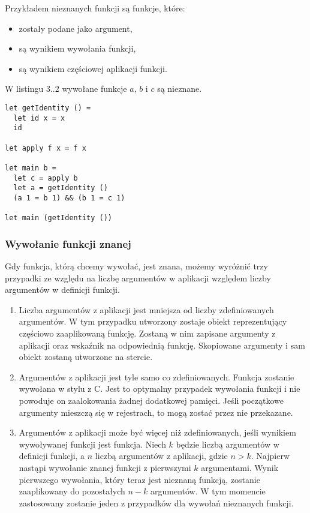 \documentclass[declaration,shortabstract]{iithesis}
\begin{document}
Przykładem nieznanych funkcji są funkcje, które: 
\begin{itemize}
  \item zostały podane jako argument,
  \item są wynikiem wywołania funkcji,
  \item są wynikiem częściowej aplikacji funkcji.
\end{itemize}

W listingu $3..2$ wywołane funkcje $a$, $b$ i $c$ są nieznane.

\begin{lstlisting}[frame=single, caption=Przykłady statycznie 
nieznanej funkcji.]
let getIdentity () = 
  let id x = x 
  id

let apply f x = f x

let main b = 
  let c = apply b 
  let a = getIdentity ()
  (a 1 = b 1) && (b 1 = c 1)

let main (getIdentity ())
\end{lstlisting}

\subsubsection{Wywołanie funkcji znanej}

Gdy funkcja, którą chcemy wywołać, jest znana, możemy wyróżnić trzy przypadki 
ze względu na liczbę argumentów w aplikacji względem liczby argumentów
w definicji funkcji.

\begin{enumerate}
  \item Liczba argumentów z aplikacji jest mniejsza od liczby zdefiniowanych 
  argumentów. W tym przypadku utworzony zostaje obiekt reprezentujący częściowo
  zaaplikowaną funkcję. Zostaną w nim zapisane argumenty z aplikacji
  oraz 
  wskaźnik na odpowiednią funkcję. Skopiowane argumenty i sam obiekt 
  zostaną 
  utworzone na stercie.
  \item Argumentów z aplikacji jest tyle samo co zdefiniowanych. 
  Funkcja zostanie wywołana w stylu z C. Jest to optymalny 
  przypadek wywołania funkcji i nie powoduje on zaalokowania żadnej 
  dodatkowej pamięci. 
  Jeśli początkowe argumenty mieszczą się w rejestrach, to mogą zostać 
  przez nie przekazane.
  \item Argumentów z aplikacji może być więcej niż zdefiniowanych, 
  jeśli wynikiem wywoływanej funkcji jest funkcja. Niech $k$ będzie 
  liczbą argumentów w definicji funkcji, a $n$ liczbą 
  argumentów z aplikacji, gdzie $n > k$. Najpierw nastąpi wywołanie znanej 
  funkcji z pierwszymi $k$ argumentami. Wynik pierwszego wywołania, 
  który teraz jest nieznaną funkcją, zostanie zaaplikowany do pozostałych
  $n - k$ argumentów. W tym momencie 
  zastosowany zostanie jeden z przypadków dla wywołań nieznanych funkcji.

\end{enumerate}
\end{document}
